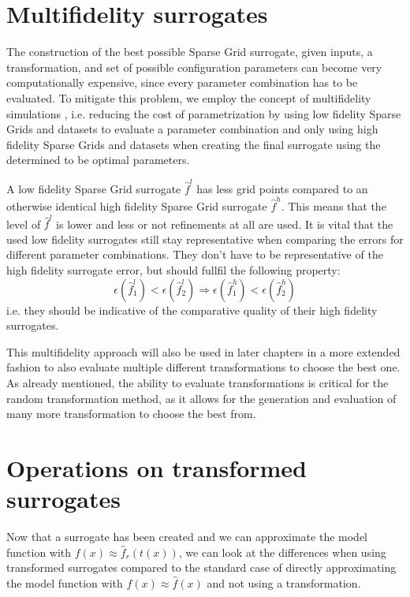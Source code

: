 \documentclass[
  a4paper,  %
  twoside,  %
  bibliography=totoc,
  headsepline,
  cleardoublepage=empty,
  parskip=half,
  draft=false
]{scrbook}
\begin{document}
\section{Multifidelity surrogates}
\label{sec:lofi}

The construction of the best possible Sparse Grid surrogate, given inputs, a transformation, and set of possible configuration parameters can become very computationally expensive, since every parameter combination has to be evaluated.
To mitigate this problem, we employ the concept of multifidelity simulations \cite{}, i.e. reducing the cost of parametrization by using low fidelity Sparse Grids and datasets to evaluate a parameter combination and only using high fidelity Sparse Grids and datasets when creating the final surrogate using the determined to be optimal parameters.

A low fidelity Sparse Grid surrogate $\hat{f}^l$ has less grid points compared to an otherwise identical high fidelity Sparse Grid surrogate $\hat{f}^h$.
This means that the level of $\hat{f}^l$ is lower and less or not refinements at all are used.
It is vital that the used low fidelity surrogates still stay representative when comparing the errors for different parameter combinations.
They don't have to be representative of the high fidelity surrogate error, but should fullfil the following property:
\begin{equation}
\epsilon(\hat{f}_1^l) < \epsilon(\hat{f}_2^l) \Rightarrow \epsilon(\hat{f}_1^h) < \epsilon(\hat{f}_2^h)
\end{equation}
i.e. they should be indicative of the comparative quality of their high fidelity surrogates.

This multifidelity approach will also be used in later chapters in a more extended fashion to also evaluate multiple different transformations to choose the best one.
As already mentioned, the ability to evaluate transformations is critical for the random transformation method, as it allows for the generation and evaluation of many more transformation to choose the best from.

\section{Operations on transformed surrogates}

Now that a surrogate has been created and we can approximate the model function with $f(x) \approx \hat{f}_r(t(x))$,
we can look at the differences when using transformed surrogates compared to the standard case of directly approximating the model function with $f(x) \approx \hat{f}(x)$ and not using a transformation.
\end{document}
